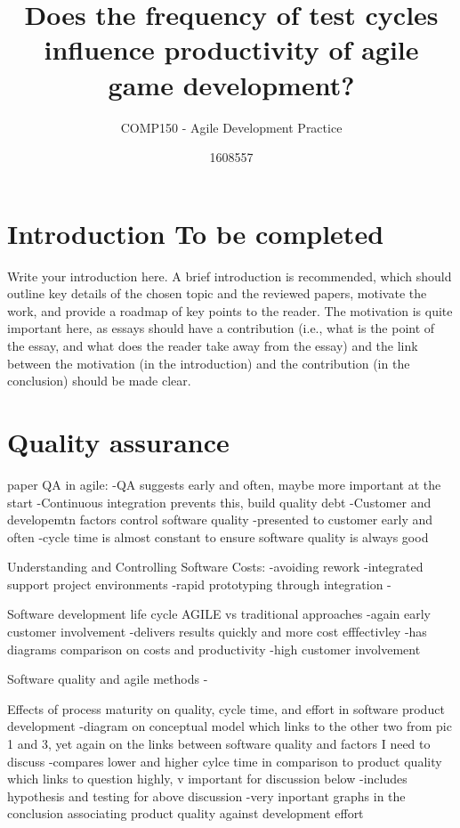 \documentclass{scrartcl}
\title{Does the frequency of test cycles influence productivity of agile game development? }
\subtitle{COMP150 - Agile Development Practice}
\author{1608557}
\begin{document}
\maketitle



\section{Introduction To be completed}

Write your introduction here. A brief introduction is recommended, which should outline key details of the chosen topic and the reviewed papers, motivate the work, and provide a roadmap of key points to the reader. The motivation is quite important here, as essays should have a contribution (i.e., what is the point of the essay, and what does the reader take away from the essay) and the link between the motivation (in the introduction) and the contribution (in the conclusion) should be made clear.

\section{Quality assurance}

paper QA in agile:
-QA suggests early and often, maybe more important at the start 
-Continuous integration prevents this, build quality debt
-Customer and developemtn factors control software quality
-presented to customer early and often
-cycle time is almost constant to ensure software quality is always good

Understanding and Controlling Software Costs:
-avoiding rework
-integrated support project environments 
-rapid prototyping through integration
-

Software development life cycle AGILE vs traditional approaches
-again early customer involvement 
-delivers results quickly and more cost efffectivley 
-has diagrams comparison on costs and productivity 
-high customer involvement 

Software quality and agile methods
-

Effects of process maturity on quality, cycle time, and effort in software product development
-diagram on conceptual model which links to the other two from pic 1 and 3, yet again on the links between software quality and factors I need to discuss
-compares lower and higher cylce time in comparison to product quality which links to question highly, v important for discussion below
-includes hypothesis and testing for above discussion
-very inportant graphs in the conclusion associating product quality against development effort
\end{document}
